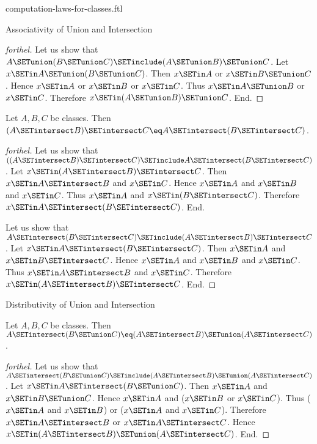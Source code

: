 \documentclass{stex}
\begin{document}
\begin{smodule}{computation-laws-for-classes.ftl}
\begin{sfragment}{Associativity of Union and Intersection}
\begin{proof}[forthel]
    Let us show that $A \SETunion (B \SETunion C) \SETinclude (A \SETunion B) \SETunion C$.
      Let $x \SETin A \SETunion (B \SETunion C)$.
      Then $x \SETin A$ or $x \SETin B \SETunion C$.
      Hence $x \SETin A$ or $x \SETin B$ or $x \SETin C$.
      Thus $x \SETin A \SETunion B$ or $x \SETin C$.
      Therefore $x \SETin (A \SETunion B) \SETunion C$.
    End.
  \end{proof}

  \begin{proposition}[forthel,id=FOUNDATIONS_02_906751977193472]
    Let $A, B, C$ be classes.
    Then $(A \SETintersect B) \SETintersect C \eq A \SETintersect (B \SETintersect C)$.
  \end{proposition}
  \begin{proof}[forthel]
    Let us show that $((A \SETintersect B) \SETintersect C) \SETinclude A \SETintersect (B \SETintersect C)$. %
      Let $x \SETin (A \SETintersect B) \SETintersect C$.
      Then $x \SETin A \SETintersect B$ and $x \SETin C$.
      Hence $x \SETin A$ and $x \SETin B$ and $x \SETin C$.
      Thus $x \SETin A$ and $x \SETin (B \SETintersect C)$.
      Therefore$ x \SETin A \SETintersect (B \SETintersect C)$.
    End.

    Let us show that $A \SETintersect (B \SETintersect C) \SETinclude (A \SETintersect B) \SETintersect C$.
      Let $x \SETin A \SETintersect (B \SETintersect C)$.
      Then $x \SETin A$ and $x \SETin B \SETintersect C$.
      Hence $x \SETin A$ and $x \SETin B$ and $x \SETin C$.
      Thus $x \SETin A \SETintersect B$ and $x \SETin C$.
      Therefore $x \SETin (A \SETintersect B) \SETintersect C$.
    End.
  \end{proof}
\end{sfragment}

\begin{sfragment}{Distributivity of Union and Intersection}
  \begin{proposition}[forthel,id=FOUNDATIONS_02_371139087958016]
    Let $A, B, C$ be classes.
    Then $A \SETintersect (B \SETunion C) \eq (A \SETintersect B) \SETunion (A \SETintersect C)$.
  \end{proposition}
  \begin{proof}[forthel]
    Let us show that $A \SETintersect (B \SETunion C) \SETinclude (A \SETintersect B) \SETunion (A \SETintersect C)$.
      Let $x \SETin A \SETintersect (B \SETunion C)$.
      Then $x \SETin A$ and $x \SETin B \SETunion C$.
      Hence $x \SETin A$ and ($x \SETin B$ or $x \SETin C$).
      Thus ($x \SETin A$ and $x \SETin B$) or ($x \SETin A$ and $x \SETin C$).
      Therefore $x \SETin A \SETintersect B$ or $x \SETin A \SETintersect C$.
      Hence $x \SETin (A \SETintersect B) \SETunion (A \SETintersect C)$.
    End.


\end{proof}
\end{sfragment}
\end{smodule}
\end{document}
